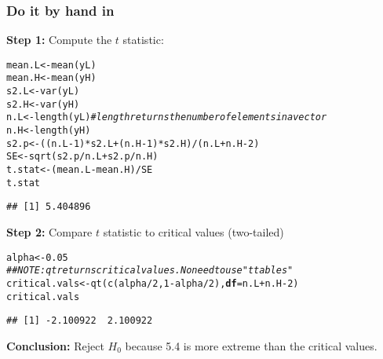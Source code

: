 \documentclass[color=usenames,dvipsnames]{beamer}\usepackage[]{graphicx}\usepackage[]{color}
\makeatletter
\newcommand{\hlnum}[1]{\textcolor[rgb]{0.69,0.494,0}{#1}}%
\newcommand{\hlcom}[1]{\textcolor[rgb]{0.514,0.506,0.514}{\textit{#1}}}%
\newcommand{\hlopt}[1]{\textcolor[rgb]{0,0,0}{#1}}%
\newcommand{\hlstd}[1]{\textcolor[rgb]{0,0,0}{#1}}%
\newcommand{\hlkwb}[1]{\textcolor[rgb]{0,0.341,0.682}{#1}}%
\newcommand{\hlkwc}[1]{\textcolor[rgb]{0,0,0}{\textbf{#1}}}%
\newcommand{\hlkwd}[1]{\textcolor[rgb]{0.004,0.004,0.506}{#1}}%
\newenvironment{kframe}{%
 \def\at@end@of@kframe{}%
 \ifinner\ifhmode%
  \def\at@end@of@kframe{\end{minipage}}%
  \begin{minipage}{\columnwidth}%
 \fi\fi%
 \def\FrameCommand##1{\hskip\@totalleftmargin \hskip-\fboxsep
 \colorbox{shadecolor}{##1}\hskip-\fboxsep
     \hskip-\linewidth \hskip-\@totalleftmargin \hskip\columnwidth}%
 \MakeFramed {\advance\hsize-\width
   \@totalleftmargin\z@ \linewidth\hsize
   \@setminipage}}%
 {\par\unskip\endMakeFramed%
 \at@end@of@kframe}
\newenvironment{knitrout}{}{} %
\makeatother
\begin{document}
\begin{frame}[fragile]
  \frametitle{Do it by hand in \R}
  \footnotesize
  {\bf Step 1:} Compute the $t$ statistic:
\begin{knitrout}\scriptsize
{}\color{fgcolor}\begin{kframe}
\begin{alltt}
\hlstd{mean.L} \hlkwb{<-} \hlkwd{mean}\hlstd{(yL)}
\hlstd{mean.H} \hlkwb{<-} \hlkwd{mean}\hlstd{(yH)}
\hlstd{s2.L} \hlkwb{<-} \hlkwd{var}\hlstd{(yL)}
\hlstd{s2.H} \hlkwb{<-} \hlkwd{var}\hlstd{(yH)}
\hlstd{n.L} \hlkwb{<-} \hlkwd{length}\hlstd{(yL)} \hlcom{# length returns the number of elements in a vector}
\hlstd{n.H} \hlkwb{<-} \hlkwd{length}\hlstd{(yH)}
\hlstd{s2.p} \hlkwb{<-} \hlstd{((n.L}\hlopt{-}\hlnum{1}\hlstd{)}\hlopt{*}\hlstd{s2.L} \hlopt{+} \hlstd{(n.H}\hlopt{-}\hlnum{1}\hlstd{)}\hlopt{*}\hlstd{s2.H)}\hlopt{/}\hlstd{(n.L}\hlopt{+}\hlstd{n.H}\hlopt{-}\hlnum{2}\hlstd{)}
\hlstd{SE} \hlkwb{<-} \hlkwd{sqrt}\hlstd{(s2.p}\hlopt{/}\hlstd{n.L} \hlopt{+} \hlstd{s2.p}\hlopt{/}\hlstd{n.H)}
\hlstd{t.stat} \hlkwb{<-} \hlstd{(mean.L} \hlopt{-} \hlstd{mean.H)} \hlopt{/} \hlstd{SE}
\hlstd{t.stat}
\end{alltt}
\begin{verbatim}
## [1] 5.404896
\end{verbatim}
\end{kframe}
\end{knitrout}
\pause
  {\bf Step 2:} Compare $t$ statistic to critical values (two-tailed)
  \footnotesize
\begin{knitrout}\scriptsize
{}\color{fgcolor}\begin{kframe}
\begin{alltt}
\hlstd{alpha} \hlkwb{<-} \hlnum{0.05}
\hlcom{## NOTE: qt returns critical values. No need to use "t tables"}
\hlstd{critical.vals} \hlkwb{<-} \hlkwd{qt}\hlstd{(}\hlkwd{c}\hlstd{(alpha}\hlopt{/}\hlnum{2}\hlstd{,} \hlnum{1}\hlopt{-}\hlstd{alpha}\hlopt{/}\hlnum{2}\hlstd{),} \hlkwc{df}\hlstd{=n.L}\hlopt{+}\hlstd{n.H}\hlopt{-}\hlnum{2}\hlstd{)}
\hlstd{critical.vals}
\end{alltt}
\begin{verbatim}
## [1] -2.100922  2.100922
\end{verbatim}
\end{kframe}
\end{knitrout}
  \pause
  {\bf Conclusion:} Reject $H_0$ because %
  5.4 is more extreme than the critical values.
\end{frame}
\end{document}
